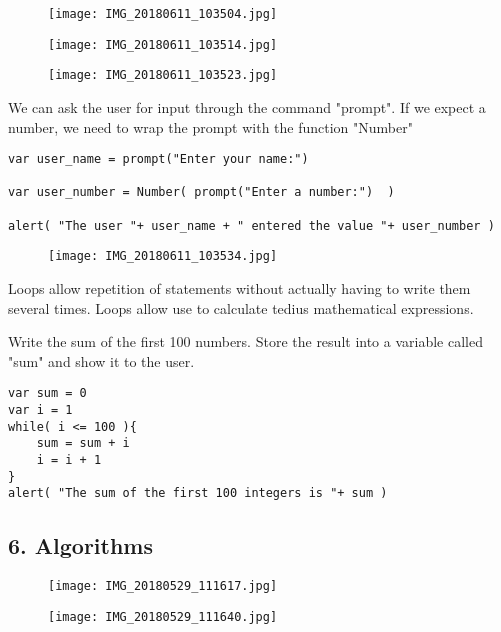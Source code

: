 \documentclass{article}
\begin{document}
\begin{figure}[H]
\texttt{[image: IMG\_20180611\_103504.jpg]}
\end{figure}
\begin{figure}[H]
\texttt{[image: IMG\_20180611\_103514.jpg]}
\end{figure}
\begin{figure}[H]
\texttt{[image: IMG\_20180611\_103523.jpg]}
\end{figure}
We can ask the user for input through the command "prompt". If we expect a number, we
need to wrap the prompt with the function "Number" 
\begin{lstlisting}
var user_name = prompt("Enter your name:")

var user_number = Number( prompt("Enter a number:")  )

alert( "The user "+ user_name + " entered the value "+ user_number )
\end{lstlisting}


\begin{figure}[H]
\texttt{[image: IMG\_20180611\_103534.jpg]}
\end{figure}
Loops allow repetition of statements without actually having to write them several times.
Loops allow use to  calculate tedius mathematical expressions.

Write the sum of the first 100 numbers. Store the result into a variable called "sum" 
and show it to the user.
\begin{lstlisting}
var sum = 0
var i = 1 
while( i <= 100 ){
    sum = sum + i
    i = i + 1
}
alert( "The sum of the first 100 integers is "+ sum )
\end{lstlisting}

\subsection{6. Algorithms}
\begin{figure}[H]
\texttt{[image: IMG\_20180529\_111617.jpg]}
\end{figure}
\begin{figure}[H]
\texttt{[image: IMG\_20180529\_111640.jpg]}
\end{figure}
\end{document}

